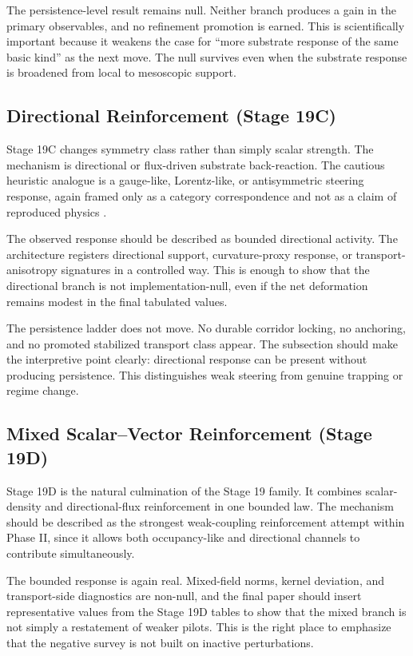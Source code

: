 \documentclass[11pt]{article}
\begin{document}
The persistence-level result remains null. Neither branch produces a gain in the primary observables, and no refinement promotion is earned. This is scientifically important because it weakens the case for ``more substrate response of the same basic kind'' as the next move. The null survives even when the substrate response is broadened from local to mesoscopic support.

\subsection{Directional Reinforcement (Stage 19C)}

Stage 19C changes symmetry class rather than simply scalar strength. The mechanism is directional or flux-driven substrate back-reaction. The cautious heuristic analogue is a gauge-like, Lorentz-like, or antisymmetric steering response, again framed only as a category correspondence and not as a claim of reproduced physics \cite{gauge_placeholder}.

The observed response should be described as bounded directional activity. The architecture registers directional support, curvature-proxy response, or transport-anisotropy signatures in a controlled way. This is enough to show that the directional branch is not implementation-null, even if the net deformation remains modest in the final tabulated values.

The persistence ladder does not move. No durable corridor locking, no anchoring, and no promoted stabilized transport class appear. The subsection should make the interpretive point clearly: directional response can be present without producing persistence. This distinguishes weak steering from genuine trapping or regime change.

\subsection{Mixed Scalar--Vector Reinforcement (Stage 19D)}

Stage 19D is the natural culmination of the Stage 19 family. It combines scalar-density and directional-flux reinforcement in one bounded law. The mechanism should be described as the strongest weak-coupling reinforcement attempt within Phase II, since it allows both occupancy-like and directional channels to contribute simultaneously.

The bounded response is again real. Mixed-field norms, kernel deviation, and transport-side diagnostics are non-null, and the final paper should insert representative values from the Stage 19D tables to show that the mixed branch is not simply a restatement of weaker pilots. This is the right place to emphasize that the negative survey is not built on inactive perturbations.
\end{document}
